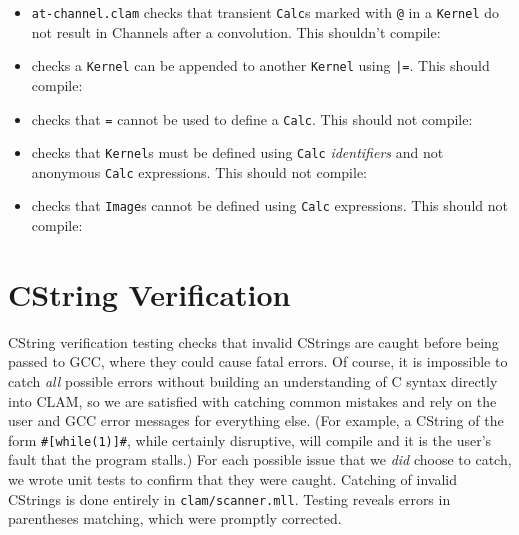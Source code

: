 \begin{itemize}
\item\texttt{at-channel.clam} checks that transient \texttt{Calc}s marked with \texttt{@} in a \texttt{Kernel}
do not result in Channels after a convolution. This shouldn't compile:


\item{} checks a \texttt{Kernel} can be appended to another \texttt{Kernel} using \texttt{|=}. This should compile:


\item{} checks that \texttt{=} cannot be used to define a \texttt{Calc}. This should not compile:


\item{} checks that \texttt{Kernel}s must be defined using \texttt{Calc} \emph{identifiers}
and not anonymous \texttt{Calc} expressions. This should not compile:


\item{} checks that \texttt{Image}s cannot be defined using \texttt{Calc} expressions. This should not compile:


\end{itemize}

\section{CString Verification}
\label{testing:cstrings}

CString verification testing checks that invalid CStrings are caught before being passed to GCC, where they
could cause fatal errors. Of course, it is impossible to catch \emph{all} possible errors without
building an understanding of C syntax directly into CLAM, so we are satisfied with catching common
mistakes and rely on the user and GCC error messages for everything else. (For example, a CString of the form \texttt{\#[while(1)]\#},
while certainly disruptive, will compile and it is the user's fault that the program stalls.)
For each possible issue that we \emph{did} choose to catch, we wrote unit tests to confirm that they were caught.
Catching of invalid CStrings is done entirely in \texttt{clam/scanner.mll}. Testing reveals errors
in parentheses matching, which were promptly corrected.\\

